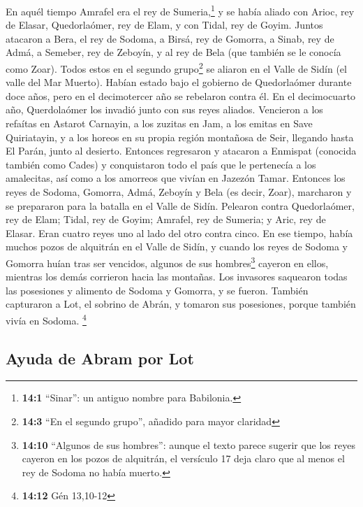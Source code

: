  En aquél tiempo Amrafel era el rey de Sumeria,\footnote{\textbf{14:1}
  ``Sinar'': un antiguo nombre para Babilonia.} y se había aliado con
Arioc, rey de Elasar, Quedorlaómer, rey de Elam, y con Tidal, rey de
Goyim.  Juntos atacaron a Bera, el rey de Sodoma, a Birsá,
rey de Gomorra, a Sinab, rey de Admá, a Semeber, rey de Zeboyín, y al
rey de Bela (que también se le conocía como Zoar).  Todos
estos en el segundo grupo\footnote{\textbf{14:3} ``En el segundo
  grupo'', añadido para mayor claridad} se aliaron en el Valle de Sidín
(el valle del Mar Muerto).  Habían estado bajo el gobierno
de Quedorlaómer durante doce años, pero en el decimotercer año se
rebelaron contra él.  En el decimocuarto año, Querdolaómer
los invadió junto con sus reyes aliados. Vencieron a los refaítas en
Astarot Carnayin, a los zuzitas en Jam, a los emitas en Save
Quiriatayin,  y a los horeos en su propia región montañosa
de Seir, llegando hasta El Parán, junto al desierto. 
Entonces regresaron y atacaron a Enmispat (conocida también como Cades)
y conquistaron todo el país que le pertenecía a los amalecitas, así como
a los amorreos que vivían en Jazezón Tamar.  Entonces los
reyes de Sodoma, Gomorra, Admá, Zeboyín y Bela (es decir, Zoar),
marcharon y se prepararon para la batalla en el Valle de Sidín.
 Pelearon contra Quedorlaómer, rey de Elam; Tidal, rey de
Goyim; Amrafel, rey de Sumeria; y Aric, rey de Elasar. Eran cuatro reyes
uno al lado del otro contra cinco.  En ese tiempo, había
muchos pozos de alquitrán en el Valle de Sidín, y cuando los reyes de
Sodoma y Gomorra huían tras ser vencidos, algunos de sus
hombres\footnote{\textbf{14:10} ``Algunos de sus hombres'': aunque el
  texto parece sugerir que los reyes cayeron en los pozos de alquitrán,
  el versículo 17 deja claro que al menos el rey de Sodoma no había
  muerto.} cayeron en ellos, mientras los demás corrieron hacia las
montañas.  Los invasores saquearon todas las posesiones y
alimento de Sodoma y Gomorra, y se fueron.  También
capturaron a Lot, el sobrino de Abrán, y tomaron sus posesiones, porque
también vivía en Sodoma. \footnote{\textbf{14:12} Gén 13,10-12}

\hypertarget{ayuda-de-abram-por-lot}{%
\subsection{Ayuda de Abram por Lot}\label{ayuda-de-abram-por-lot}}

